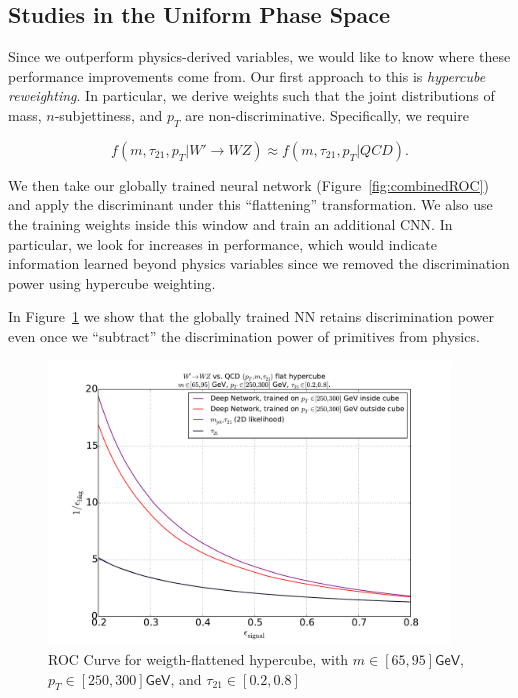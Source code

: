\subsection{Studies in the Uniform Phase Space} %
\label{sub:flat_hypercube_studies}

Since we outperform physics-derived variables, we would like to know where these performance improvements come from. Our first approach to this is \emph{hypercube reweighting}. In particular, we derive weights such that the joint distributions of mass, $n$-subjettiness, and $p_T$ are non-discriminative. Specifically, we require

\begin{equation}
  f(m, \tau_{21}, p_T| W'\rightarrow WZ) \approx f(m, \tau_{21}, p_T| QCD).
\end{equation}

We then take our globally trained neural network (Figure~\ref{fig:combinedROC}) and apply the discriminant under this ``flattening'' transformation. We also use the training weights inside this window and train an additional CNN. In particular, we look for increases in performance, which would indicate information learned beyond physics variables since we removed the discrimination power using hypercube weighting.

In Figure~\ref{fig:rocCube} we show that the globally trained NN retains discrimination power even once we ``subtract'' the discrimination power of primitives from physics.

\begin{figure}[htbp]
  \centering
  \includegraphics[width=0.95\textwidth]{figures/roc-cube-inside.pdf}
  \caption{ROC Curve for weigth-flattened hypercube, with $m\in[65, 95]\mathsf{GeV}$,  $p_T\in[250, 300]\mathsf{GeV}$, and  $\tau_{21}\in[0.2, 0.8]$}
  \label{fig:rocCube}
\end{figure}

